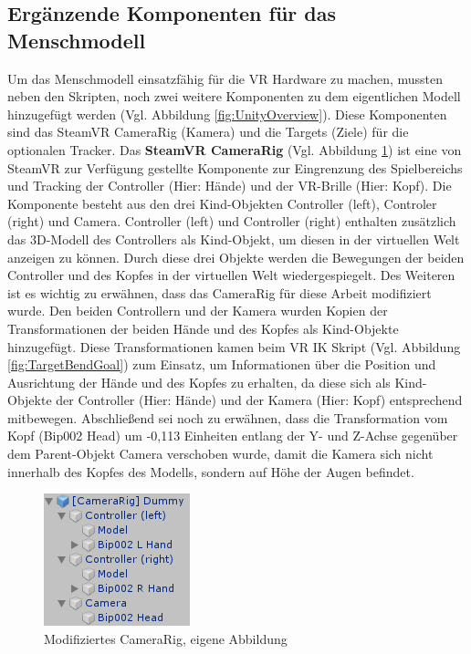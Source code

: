 \subsection{Ergänzende Komponenten für das Menschmodell}\label{sec:MMKomponenten}
Um das Menschmodell einsatzfähig für die VR Hardware zu machen, mussten neben den Skripten, noch zwei weitere Komponenten zu dem eigentlichen Modell hinzugefügt werden (Vgl. Abbildung \ref{fig:UnityOverview}). Diese Komponenten sind das SteamVR CameraRig (Kamera) und die Targets (Ziele) für die optionalen Tracker.
\newline\newline
Das \textbf{SteamVR CameraRig} (Vgl. Abbildung \ref{fig:CameraRig}) ist eine von SteamVR zur Verfügung gestellte Komponente zur Eingrenzung des Spielbereichs und Tracking der Controller (Hier: Hände) und der VR-Brille (Hier: Kopf). Die Komponente besteht aus den drei Kind-Objekten Controller (left), Controler (right) und Camera. Controller (left) und Controller (right) enthalten zusätzlich das 3D-Modell des Controllers als Kind-Objekt, um diesen in der virtuellen Welt anzeigen zu können. Durch diese drei Objekte werden die Bewegungen der beiden Controller und des Kopfes in der virtuellen Welt wiedergespiegelt. Des Weiteren ist es wichtig zu erwähnen, dass das CameraRig für diese Arbeit modifiziert wurde. Den beiden Controllern und der Kamera wurden Kopien der Transformationen der beiden Hände und des Kopfes als Kind-Objekte hinzugefügt. Diese Transformationen kamen beim VR IK Skript (Vgl. Abbildung \ref{fig:TargetBendGoal}) zum Einsatz, um Informationen über die Position und Ausrichtung der Hände und des Kopfes zu erhalten, da diese sich als Kind-Objekte der Controller (Hier: Hände) und der Kamera (Hier: Kopf) entsprechend mitbewegen. Abschließend sei noch zu erwähnen, dass die Transformation vom Kopf (Bip002 Head) um -0,113 Einheiten entlang der Y- und Z-Achse gegenüber dem Parent-Objekt Camera verschoben wurde, damit die Kamera sich nicht innerhalb des Kopfes des Modells, sondern auf Höhe der Augen befindet.
\begin{figure}[h]
	\centering
	\includegraphics[width=0.25\linewidth]{Bilder/A37_CameraRig}
	\caption{Modifiziertes CameraRig, eigene Abbildung}
	\label{fig:CameraRig}
\end{figure}

